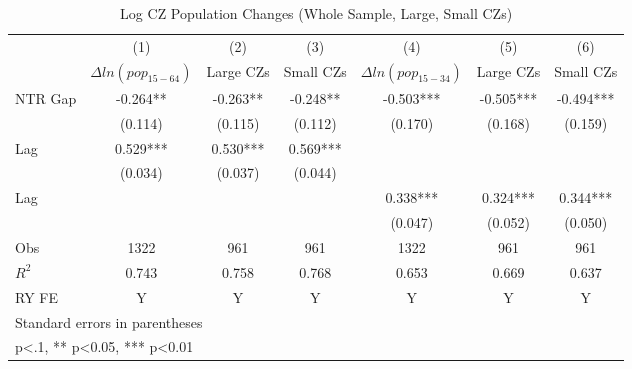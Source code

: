 \documentclass[12pt, final]{CSP}
\begin{document}
\begin{table}[htbp]\centering
\def\sym#1{\ifmmode^{#1}\else\(^{#1}\)\fi}
\caption{Log CZ Population Changes (Whole Sample, Large, Small CZs)}
\begin{tabular}{l*{6}{c}}
\hline
\hline
\toprule
&\multicolumn{1}{c}{(1)}&\multicolumn{1}{c}{(2)}&\multicolumn{1}{c}{(3)}&\multicolumn{1}{c}{(4)}&\multicolumn{1}{c}{(5)}&\multicolumn{1}{c}{(6)}\\
&\multicolumn{1}{c}{$\Delta ln(pop_{15-64})$}&\multicolumn{1}{c}{Large CZs}&\multicolumn{1}{c}{Small CZs}&\multicolumn{1}{c}{$\Delta ln(pop_{15-34})$}&\multicolumn{1}{c}{Large CZs}&\multicolumn{1}{c}{Small CZs}\\
\hline
\midrule
NTR Gap             &   -0.264** &   -0.263** &   -0.248** &   -0.503***&   -0.505***&   -0.494***\\
                    &  (0.114)   &  (0.115)   &  (0.112)   &  (0.170)   &  (0.168)   &  (0.159)   \\
\addlinespace
Lag    &    0.529***&    0.530***&    0.569***&            &            &            \\
                    &  (0.034)   &  (0.037)   &  (0.044)   &            &            &            \\
\addlinespace
Lag    &            &            &            &    0.338***&    0.324***&    0.344***\\
                    &            &            &            &  (0.047)   &  (0.052)   &  (0.050)   \\
\midrule
Obs        &     1322   &      961   &      961   &     1322   &      961   &      961   \\
\(R^{2}\)           &    0.743   &    0.758   &    0.768   &    0.653   &    0.669   &    0.637   \\
RY FE      &        Y   &        Y   &        Y   &        Y   &        Y   &        Y   \\
\bottomrule
\hline
\multicolumn{7}{l}{\footnotesize Standard errors in parentheses}\\
\multicolumn{7}{l}{\footnotesize * p<.1, ** p<0.05, *** p<0.01}\\
\end{tabular}
\end{table}
\end{document}
